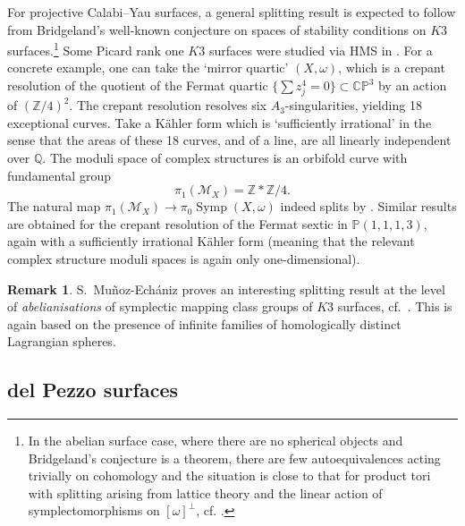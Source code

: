 \documentclass[pdftex]{sigma}
\DeclareMathOperator{\Symp}{Symp}
\def\bP{\mathbb{P}}
\def\bZ{\mathbb{Z}}
\def\bQ{\mathbb{Q}}
\def\bC{\mathbb{C}}
\theoremstyle{definition}
\newtheorem{rmk}[thm]{Remark}
\numberwithin{equation}{section}
\begin{document}
For projective Calabi--Yau surfaces, a general splitting result is expected to follow from Bridgeland's well-known conjecture on spaces of stability conditions on $K3$ surfaces.\footnote{In the abelian surface case, where there are no spherical objects and Bridgeland's conjecture is a theorem, there are few autoequivalences acting trivially on cohomology and the situation is close to that for product tori with splitting arising from lattice theory and the linear action of symplectomorphisms on $[\omega]^{\perp}$, cf. \cite{Fan-Lai}.}
Some Picard rank one $K3$ surfaces were studied via HMS in \cite{Sheridan-Smith:K3}. For a concrete example, one can take the `mirror quartic' $(X,\omega)$, which is a crepant resolution of the quotient of the Fermat quartic $\bigl\{\sum z_j^4 = 0\bigr\} \subset \bC\bP^3$ by an action of $(\bZ/4)^2$. The crepant resolution resolves six $A_3$-singularities, yielding 18 exceptional curves. Take a K\"ahler form which is `sufficiently irrational' in the sense that the areas of these 18 curves, and of a line, are all linearly independent over $\bQ$. The moduli space of complex structures is an orbifold curve with fundamental group
\[
\pi_1(\mathcal{M}_X) = \bZ \ast \bZ/4.
\]
The natural map $\pi_1(\mathcal{M}_X) \to \pi_0\Symp(X,\omega)$ indeed splits by \cite[Section 7.2]{Sheridan-Smith:K3}. Similar results are obtained for the crepant resolution of the Fermat sextic in $\bP(1,1,1,3)$, again with a sufficiently irrational K\"ahler form (meaning that the relevant complex structure moduli spaces is again only one-dimensional).

\begin{rmk}
 S.~Mu\~noz-Ech\'aniz proves an interesting splitting result at the level of \emph{abelianisations} of symplectic mapping class groups of $K3$ surfaces, cf.~\cite[Theorem B]{Munoz-Echaniz}. This is again based on the presence of infinite families of homologically distinct Lagrangian spheres.
\end{rmk}

\subsection{del Pezzo surfaces}
\end{document}
